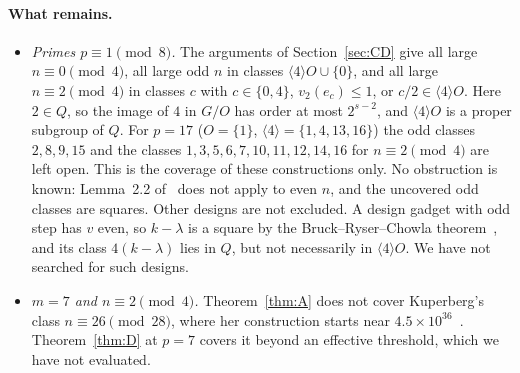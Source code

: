 \documentclass[10pt]{article}
\theoremstyle{remark}
\begin{document}
\paragraph{What remains.}
\begin{itemize}
\item \emph{Primes $p\equiv1\pmod8$.} The arguments of Section~\ref{sec:CD} give all large $n\equiv0\pmod4$, all large odd $n$ in classes $\langle4\rangle O\cup\{0\}$, and all large $n\equiv2\pmod4$ in classes $c$ with $c\in\{0,4\}$, $v_2(e_c)\le1$, or $c/2\in\langle4\rangle O$. Here $2\in Q$, so the image of $4$ in $G/O$ has order at most $2^{s-2}$, and $\langle4\rangle O$ is a proper subgroup of $Q$. For $p=17$ ($O=\{1\}$, $\langle4\rangle=\{1,4,13,16\}$) the odd classes $2,8,9,15$ and the classes $1,3,5,6,7,10,11,12,14,16$ for $n\equiv2\pmod4$ are left open. This is the coverage of these constructions only. No obstruction is known: Lemma~2.2 of~\cite{K} does not apply to even $n$, and the uncovered odd classes are squares. Other designs are not excluded. A design gadget with odd step has $v$ even, so $k-\lambda$ is a square by the Bruck--Ryser--Chowla theorem~\cite{IT07}, and its class $4(k-\lambda)$ lies in $Q$, but not necessarily in $\langle4\rangle O$. We have not searched for such designs.
\item \emph{$m=7$ and $n\equiv2\pmod4$.} Theorem~\ref{thm:A} does not cover Kuperberg's class $n\equiv26\pmod{28}$, where her construction starts near $4.5\times10^{36}$~\cite[Proposition~4.7]{K}. Theorem~\ref{thm:D} at $p=7$ covers it beyond an effective threshold, which we have not evaluated.

\end{itemize}
\end{document}
